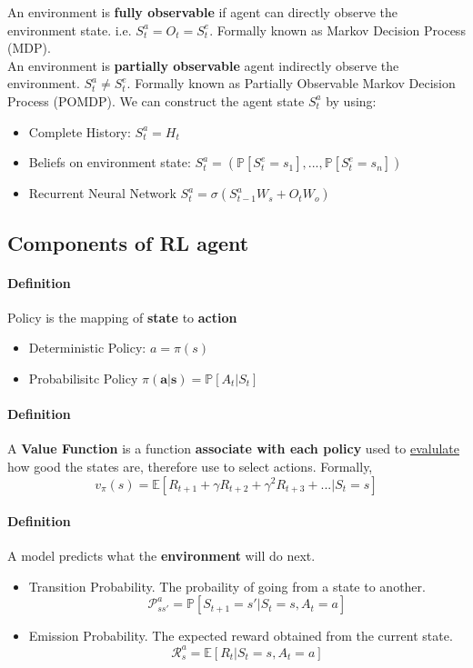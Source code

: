  	An environment is \textbf{fully observable} if agent can directly observe the environment state. i.e. $S^a_t = O_t = S^e_t$. Formally known as Markov Decision Process (MDP).\\
 	An environment is \textbf{partially observable} agent indirectly observe the environment. $S^a_t \ne S^e_t $. Formally known as Partially Observable Markov Decision Process (POMDP). We can construct the agent state $S^a_t$ by using:
	\begin{itemize}
	\item Complete History: $S^a_t = H_t$
	\item Beliefs on environment state: $S^a_t = (\mathbb{P}[S^e_t = s_1],...,\mathbb{P}[S^e_t = s_n] )$
	\item Recurrent Neural Network $S^a_t = \sigma(S^a_{t-1} W_s + O_t W_o)$
	\end{itemize}

	\subsection{Components of RL agent}
	\paragraph{Definition} Policy is the mapping of \textbf{state} to \textbf{action}
	\begin{itemize}
	\item Deterministic Policy: $a = \pi(s)$
	\item Probabilisitc Policy $ \pi(\mathbf{a|s}) = \mathbb{P}[A_t|S_t] $
	\end{itemize}
	\paragraph{Definition} A \textbf{Value Function} is a function \textbf{associate with each policy} used to \underline{evalulate} how good the states are, therefore use to select actions. Formally,
	\begin{equation*}
	v_{\pi}(s) = \mathbb{E}[R_{t+1} + \gamma R_{t+2} + \gamma^2R_{t+3} + ... | S_t = s]
	\end{equation*}
	\paragraph{Definition} A model predicts what the \textbf{environment} will do next.
	\begin{itemize}
	\item Transition Probability. The probaility of going from a state to another.
	\begin{equation*}
	\mathcal{P}^a_{ss'} = \mathbb{P}[S_{t+1} = s' | S_t = s, A_t = a]
	\end{equation*}
	\item Emission Probability. The expected reward obtained from the current state. 
	\begin{equation*}
	\mathcal{R}^a_s = \mathbb{E}[R_t | S_t = s, A_t = a]
	\end{equation*}
	 \end{itemize}

